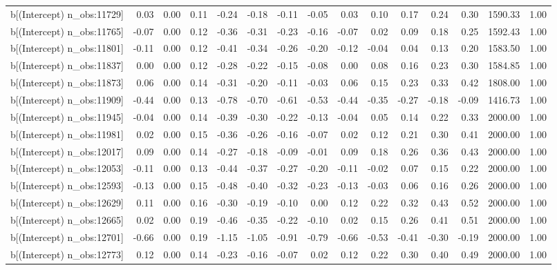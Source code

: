 \begin{table}[ht]
\begin{tabular}{rrrrrrrrrrrrrrr}
  b[(Intercept) n\_obs:11729] & 0.03 & 0.00 & 0.11 & -0.24 & -0.18 & -0.11 & -0.05 & 0.03 & 0.10 & 0.17 & 0.24 & 0.30 & 1590.33 & 1.00 \\ 
  b[(Intercept) n\_obs:11765] & -0.07 & 0.00 & 0.12 & -0.36 & -0.31 & -0.23 & -0.16 & -0.07 & 0.02 & 0.09 & 0.18 & 0.25 & 1592.43 & 1.00 \\ 
  b[(Intercept) n\_obs:11801] & -0.11 & 0.00 & 0.12 & -0.41 & -0.34 & -0.26 & -0.20 & -0.12 & -0.04 & 0.04 & 0.13 & 0.20 & 1583.50 & 1.00 \\ 
  b[(Intercept) n\_obs:11837] & 0.00 & 0.00 & 0.12 & -0.28 & -0.22 & -0.15 & -0.08 & 0.00 & 0.08 & 0.16 & 0.23 & 0.30 & 1584.85 & 1.00 \\ 
  b[(Intercept) n\_obs:11873] & 0.06 & 0.00 & 0.14 & -0.31 & -0.20 & -0.11 & -0.03 & 0.06 & 0.15 & 0.23 & 0.33 & 0.42 & 1808.00 & 1.00 \\ 
  b[(Intercept) n\_obs:11909] & -0.44 & 0.00 & 0.13 & -0.78 & -0.70 & -0.61 & -0.53 & -0.44 & -0.35 & -0.27 & -0.18 & -0.09 & 1416.73 & 1.00 \\ 
  b[(Intercept) n\_obs:11945] & -0.04 & 0.00 & 0.14 & -0.39 & -0.30 & -0.22 & -0.13 & -0.04 & 0.05 & 0.14 & 0.22 & 0.33 & 2000.00 & 1.00 \\ 
  b[(Intercept) n\_obs:11981] & 0.02 & 0.00 & 0.15 & -0.36 & -0.26 & -0.16 & -0.07 & 0.02 & 0.12 & 0.21 & 0.30 & 0.41 & 2000.00 & 1.00 \\ 
  b[(Intercept) n\_obs:12017] & 0.09 & 0.00 & 0.14 & -0.27 & -0.18 & -0.09 & -0.01 & 0.09 & 0.18 & 0.26 & 0.36 & 0.43 & 2000.00 & 1.00 \\ 
  b[(Intercept) n\_obs:12053] & -0.11 & 0.00 & 0.13 & -0.44 & -0.37 & -0.27 & -0.20 & -0.11 & -0.02 & 0.07 & 0.15 & 0.22 & 2000.00 & 1.00 \\ 
  b[(Intercept) n\_obs:12593] & -0.13 & 0.00 & 0.15 & -0.48 & -0.40 & -0.32 & -0.23 & -0.13 & -0.03 & 0.06 & 0.16 & 0.26 & 2000.00 & 1.00 \\ 
  b[(Intercept) n\_obs:12629] & 0.11 & 0.00 & 0.16 & -0.30 & -0.19 & -0.10 & 0.00 & 0.12 & 0.22 & 0.32 & 0.43 & 0.52 & 2000.00 & 1.00 \\ 
  b[(Intercept) n\_obs:12665] & 0.02 & 0.00 & 0.19 & -0.46 & -0.35 & -0.22 & -0.10 & 0.02 & 0.15 & 0.26 & 0.41 & 0.51 & 2000.00 & 1.00 \\ 
  b[(Intercept) n\_obs:12701] & -0.66 & 0.00 & 0.19 & -1.15 & -1.05 & -0.91 & -0.79 & -0.66 & -0.53 & -0.41 & -0.30 & -0.19 & 2000.00 & 1.00 \\ 
  b[(Intercept) n\_obs:12773] & 0.12 & 0.00 & 0.14 & -0.23 & -0.16 & -0.07 & 0.02 & 0.12 & 0.22 & 0.30 & 0.40 & 0.49 & 2000.00 & 1.00 \\ 

\end{tabular}
\end{table}

